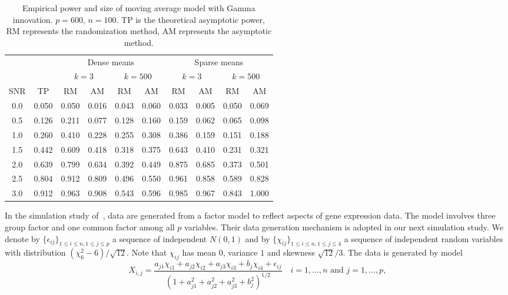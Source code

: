 \documentclass[review]{elsarticle}
\theoremstyle{plain}
\theoremstyle{definition}
\theoremstyle{remark}
\begin{document}
\begin{table}[ht]
    \caption{Empirical power and size of moving average model with Gamma innovation.  $p=600$, $n=100$. TP is the theoretical asymptotic power, RM represents the randomization method, AM represents the asymptotic method.}
    \centering
    \begin{tabular}{cccccccccc}
          \toprule
          & & \multicolumn{4}{c}{Dense means} &\multicolumn{4}{c}{Sparse means}\\
          \cmidrule(r){3-6}\cmidrule(r){7-10}
          & & \multicolumn{2}{c}{$k=3$} & \multicolumn{2}{c}{$k=500$} & \multicolumn{2}{c}{$k=3$}& \multicolumn{2}{c}{$k=500$}\\
          \cmidrule(r){3-4}  \cmidrule(r){5-6} \cmidrule(r){7-8}  \cmidrule(r){9-10}
           SNR& TP & RM & AM & RM & AM & RM & AM & RM & AM \\ 
            \midrule
        0.0 & 0.050 & 0.050 & 0.016 & 0.043 & 0.060 & 0.033 & 0.005 & 0.050 & 0.069 \\ 
      0.5 & 0.126 & 0.211 & 0.077 & 0.128 & 0.160 & 0.159 & 0.062 & 0.065 & 0.098 \\ 
        1.0 & 0.260 & 0.410 & 0.228 & 0.255 & 0.308 & 0.386 & 0.159 & 0.151 & 0.188 \\ 
      1.5 & 0.442 & 0.609 & 0.418 & 0.318 & 0.375 & 0.643 & 0.410 & 0.231 & 0.321 \\ 
        2.0 & 0.639 & 0.799 & 0.634 & 0.392 & 0.449 & 0.875 & 0.685 & 0.373 & 0.501 \\ 
      2.5 & 0.804 & 0.912 & 0.809 & 0.496 & 0.550 & 0.961 & 0.858 & 0.589 & 0.828 \\ 
        3.0 & 0.912 & 0.963 & 0.908 & 0.543 & 0.596 & 0.985 & 0.967 & 0.843 & 1.000 \\ 
        \bottomrule
    \end{tabular}
\end{table}
In the simulation study of~\cite{fan2007to}, data are generated from a factor model to reflect aspects of gene expression data. The model involves three group factor and one common factor among all $p$ variables. 
 Their data generation mechanism is adopted in our next simulation study.
We denote by $\{\epsilon_{ij}\}_{1\leq i\leq n, 1\leq j\leq p}$ a sequence of independent $N(0,1)$ and by $\{\chi_{ij}\}_{1\leq i \leq n, 1\leq j \leq 4}$ a sequence of independent random variables with distribution $(\chi_{6}^2-6)/\sqrt{12}$.
Note that $\chi_{ij}$ has mean $0$, variance $1$ and skewness $\sqrt{12}/3$.
The data is generated by model
\begin{equation*}
    X_{i,j}=\frac{a_{j1}\chi_{i1}+a_{j2}\chi_{i2}+a_{j3}\chi_{i3}+b_{j}\chi_{i4}+\epsilon_{ij}}{{(1+a_{j1}^2+a_{j2}^2+a_{j3}^2+b_j^2)}^{1/2}}
    \quad
    \textrm{$i=1,\ldots, n$ and $j=1,\ldots, p$},
\end{equation*}
\end{document}
